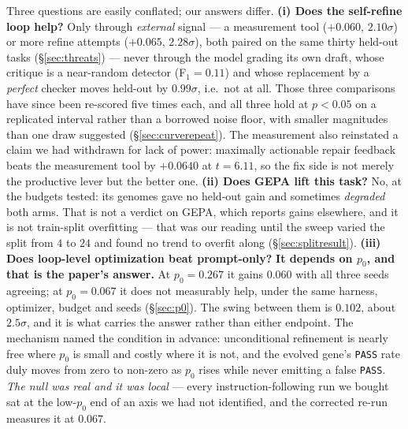 \documentclass[11pt]{article}
\begin{document}
Three questions are easily conflated; our answers differ. \textbf{(i) Does the self-refine loop
help?} Only through \emph{external} signal --- a measurement tool ($+0.060$, $2.10\sigma$) or
more refine attempts ($+0.065$, $2.28\sigma$), both paired on the same thirty held-out tasks
(\S\ref{sec:threats}) --- never through the model grading its own draft, whose critique is a
near-random detector (F$_1\!=\!0.11$) and whose replacement by a \emph{perfect} checker
moves held-out by $0.99\sigma$, i.e.\ not at all. Those three comparisons have since been
re-scored five times each, and all three hold at $p<0.05$ on a replicated interval rather than a
borrowed noise floor, with smaller magnitudes than one draw suggested
(\S\ref{sec:curverepeat}). The measurement also reinstated a claim we had withdrawn for lack of
power: maximally actionable repair feedback beats the measurement tool by $+0.0640$ at
$t = 6.11$, so the fix side is not merely the productive lever but the better one. \textbf{(ii) Does GEPA lift this task?} No, at the
budgets tested: its genomes gave no held-out gain and sometimes \emph{degraded} both arms. That is
not a verdict on GEPA, which reports gains elsewhere, and it is not train-split overfitting ---
that was our reading until the sweep varied the split from $4$ to $24$ and found no trend to
overfit along (\S\ref{sec:splitresult}). \textbf{(iii) Does loop-level optimization beat
prompt-only?} \textbf{It depends on $p_0$, and that is the paper's answer.} At $p_0 = 0.267$ it
gains $0.060$ with all three seeds agreeing; at $p_0 = 0.067$ it does not measurably help, under
the same harness, optimizer, budget and seeds (\S\ref{sec:p0}). The swing between them
is $0.102$, about $2.5\sigma$, and it is what carries the answer rather than either endpoint. The mechanism named the
condition in advance: unconditional refinement is nearly free where $p_0$ is small and costly
where it is not, and the evolved gene's \texttt{PASS} rate duly moves from zero to non-zero as
$p_0$ rises while never emitting a false \texttt{PASS}. \emph{The null was real and it was local}
--- every instruction-following run we bought sat at the low-$p_0$ end of an axis we had not
identified, and the corrected re-run measures it at $0.067$.
\end{document}
